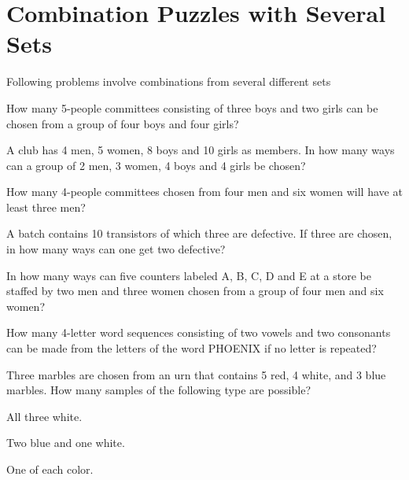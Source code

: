 \section{Combination Puzzles with Several Sets}

Following problems involve combinations from several different sets

\begin{puzzle}
    How many 5-people committees consisting of three boys and two girls can be chosen from a group of four boys and four girls?
\end{puzzle}

\begin{puzzle}
    A club has 4 men, 5 women, 8 boys and 10 girls as members. In how many ways can a group of 2 men, 3 women, 4 boys and 4 girls be chosen?
\end{puzzle}

\begin{puzzle}
    How many 4-people committees chosen from four men and six women will have at least three men?
\end{puzzle}

\begin{puzzle}
    A batch contains 10 transistors of which three are defective. If three are chosen, in how many ways can one get two defective?
\end{puzzle}

\begin{puzzle}
    In how many ways can five counters labeled A, B, C, D and E at a store be staffed by two men and three women chosen from a group of four men and six women?
\end{puzzle}

\begin{puzzle}
    How many 4-letter word sequences consisting of two vowels and two consonants can be made from the letters of the word PHOENIX if no letter is repeated?
\end{puzzle}

Three marbles are chosen from an urn that contains 5 red, 4 white, and 3 blue marbles. How many samples
of the following type are possible?

\begin{puzzle}
    All three white.
\end{puzzle}

\begin{puzzle}
    Two blue and one white.
\end{puzzle}

\begin{puzzle}
    One of each color.
\end{puzzle}

